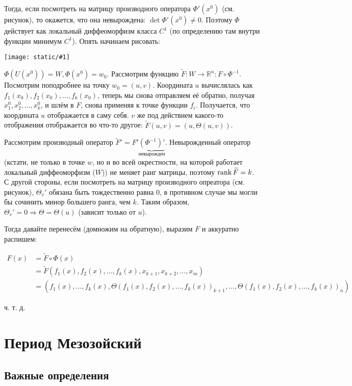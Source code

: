 \documentclass{article}
\def\image#1{\texttt{[image: static/\#1]}}
\begin{document}
Тогда, если посмотреть на матрицу производного оператора $\Phi'(x^0)$ (см. рисунок), то окажется, что она невырождена: $\det \Phi'(x^0) \neq 0$. Поэтому $\Phi$ действует как локальный диффеоморфизм класса $C^1$ (по определению там внутри функции минимум $C^1$). Опять начинаем рисовать:

\image{func_zav.png}

$\Phi(U(x^0)) = W, \Phi(x^0) = w_0$. Рассмотрим функцию $\widetilde{F}: W \rightarrow \mathbb{R}^n: F \circ \Phi^{-1}$. Посмотрим поподробнее на точку $w_0 = (u, v)$. Координата $u$ вычислялась как $f_1(x_0), f_2(x_0), \ldots, f_k(x_0)$, теперь мы снова отправляем её обратно, получая $x^0_1, x^0_2, \ldots, x^0_k$, и шлём в $F$, снова применяя к точке функции $f_i$. Получается, что координата $u$ отображается в саму себя. $v$ же под действием какого-то отображения отображается во что-то другое: $\widetilde{F}(u, v) = (u, \Theta(u, v))$.

Рассмотрим производный оператор $\widetilde{F}' = F' \underbrace{\left(\Phi^{-1}\right)'}_{\text{невырожден}}$. Невырожденный оператор (кстати, не только в точке $w$, но и во всей окрестности, на которой работает локальный диффеоморфизм ($W$)) не меняет ранг матрицы, поэтому $\rank \widetilde{F} = k$. С другой стороны, если посмотреть на матрицу производного опреатора (см. рисунок), $\Theta_v'$ обязана быть тождественно равна 0, в противном случае мы могли бы сочинить минор большего ранга, чем $k$. Таким образом, $\Theta_v' = 0 \Rightarrow \Theta = \Theta(u)$ (зависит только от $u$).

Тогда давайте перенесём (домножим на обратную), выразим $F$ и аккуратно распишем:

\begin{align*}
        F(x) &= \widetilde{F} \circ \Phi (x) \\
        &= \widetilde{F}(f_1(x), f_2(x), \ldots, f_k(x), x_{k + 1}, x_{k + 2}, \ldots, x_m) \\
        &= (f_1(x), \ldots, f_k(x), \Theta\left(f_1(x), f_2(x), \ldots, f_k(x)\right)_{k + 1}, \ldots, \Theta\left(f_1(x), f_2(x), \ldots, f_k(x)\right)_n)
\end{align*}

ч. т. д.

\newpage

\section{Период Мезозойский}
\subsection{Важные определения}
\end{document}
